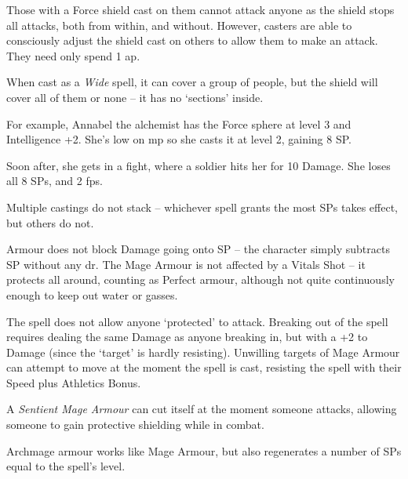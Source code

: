 \begin{multicols}{2}
Those with a Force shield cast on them cannot attack anyone as the shield stops all attacks, both from within, and without.
However, casters are able to consciously adjust the shield cast on others to allow them to make an attack.
They need only spend 1 \gls{ap}.

When cast as a \textit{Wide} spell, it can cover a group of people, but the shield will cover all of them or none -- it has no `sections' inside.

\begin{exampletext}
  For example, Annabel the alchemist has the Force sphere at level 3 and Intelligence +2.
  She's low on \gls{mp} so she casts it at level 2, gaining 8 \gls{SP}.
  
  Soon after, she gets in a fight, where a soldier hits her for 10 Damage.
  She loses all 8 \glspl{SP}, and 2 \glspl{fp}.
\end{exampletext}

Multiple castings do not stack -- whichever spell grants the most \glspl{SP} takes effect, but others do not.

Armour does not block Damage going onto \gls{SP} -- the character simply subtracts \gls{SP} without any \gls{dr}.
The Mage Armour is not affected by a Vitals Shot -- it protects all around, counting as Perfect armour, although not quite continuously enough to keep out water or gasses.

The spell does not allow anyone `protected' to attack.
Breaking out of the spell requires dealing the same Damage as anyone breaking in, but with a +2 to Damage (since the `target' is hardly resisting).
Unwilling targets of Mage Armour can attempt to move at the moment the spell is cast, resisting the spell with their Speed plus Athletics Bonus.

A \textit{Sentient Mage Armour} can cut itself at the moment someone attacks, allowing someone to gain protective shielding while in combat.

\spelllevel


Archmage armour works like Mage Armour, but also regenerates a number of \glspl{SP} equal to the spell's level.

\end{multicols}


